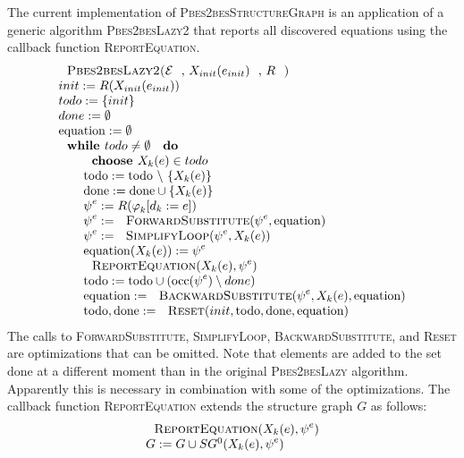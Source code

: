 The current implementation of \textsc{Pbes2besStructureGraph} is an
application of a generic algorithm \textsc{Pbes2besLazy2} that reports all
discovered equations using the callback function \textsc{ReportEquation}.%
\begin{equation*}
\begin{array}{l}
\text{\textsc{Pbes2besLazy2(}}\mathcal{E}\text{, }X_{init}(e_{init})\text{, }%
R\text{\textsc{)}} \\ 
init:=R(X_{init}(e_{init})) \\ 
todo:=\{init\} \\ 
done:=\emptyset  \\ 
\mathrm{equation}:=\emptyset  \\ 
\text{\textbf{while }}todo\neq \emptyset \text{ \textbf{do}} \\ 
\qquad \text{\textbf{choose }}X_{k}(e)\in todo \\ 
\qquad \mathrm{todo}:=\mathrm{todo}\ \backslash \ \{X_{k}(e)\} \\ 
\qquad \mathrm{done}:=\mathrm{done}\cup \{X_{k}(e)\} \\ 
\qquad \psi ^{e}:=R(\varphi _{k}[d_{k}:=e]) \\ 
\qquad \psi ^{e}:=\text{\textsc{ForwardSubstitute}}(\psi ^{e},\mathrm{%
equation}) \\ 
\qquad \psi ^{e}:=\text{\textsc{SimplifyLoop}}(\psi ^{e},X_{k}(e)) \\ 
\qquad \mathrm{equation}(X_{k}(e)):=\psi ^{e} \\ 
\qquad \text{\textsc{ReportEquation}}(X_{k}(e),\psi ^{e}) \\ 
\qquad \mathrm{todo}:=\mathrm{todo}\cup (\mathrm{occ}(\psi ^{e})\setminus
done) \\ 
\qquad \mathrm{equation}:=\text{\textsc{BackwardSubstitute}}(\psi
^{e},X_{k}(e),\mathrm{equation}) \\ 
\qquad \mathrm{todo},\mathrm{done}:=\text{\textsc{Reset}}(init,\mathrm{todo},%
\mathrm{done},\mathrm{equation})%
\end{array}%
\end{equation*}%
The calls to \textsc{ForwardSubstitute}, \textsc{SimplifyLoop}, \textsc{%
BackwardSubstitute}, and \textsc{Reset} are optimizations that can be
omitted. Note that elements are added to the set $\mathrm{done}$ at a
different moment than in the original \textsc{Pbes2besLazy} algorithm.
Apparently this is necessary in combination with some of the optimizations.
The callback function \textsc{ReportEquation} extends the structure graph $G$
as follows:%
\begin{equation*}
\begin{array}{l}
\text{\textsc{ReportEquation}}(X_{k}(e),\psi ^{e}) \\ 
G:=G\cup SG^{0}(X_{k}(e),\psi ^{e})%
\end{array}%
\end{equation*}

